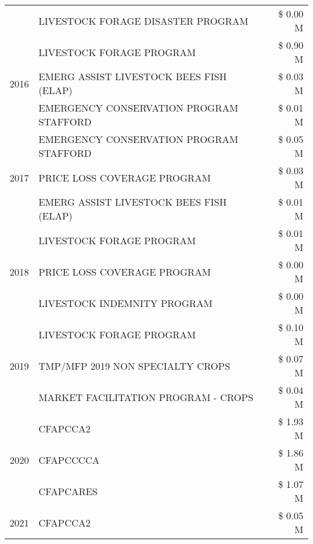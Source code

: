 \begin{tabular}{llr}
 & LIVESTOCK FORAGE DISASTER PROGRAM & \$ 0.00 M \\
\cline{1-3}
\multirow[t]{3}{*}{2016} & LIVESTOCK FORAGE PROGRAM & \$ 0.90 M \\
 & EMERG ASSIST LIVESTOCK BEES FISH (ELAP) & \$ 0.03 M \\
 & EMERGENCY CONSERVATION PROGRAM STAFFORD & \$ 0.01 M \\
\cline{1-3}
\multirow[t]{3}{*}{2017} & EMERGENCY CONSERVATION PROGRAM STAFFORD & \$ 0.05 M \\
 & PRICE LOSS COVERAGE PROGRAM & \$ 0.03 M \\
 & EMERG ASSIST LIVESTOCK BEES FISH (ELAP) & \$ 0.01 M \\
\cline{1-3}
\multirow[t]{3}{*}{2018} & LIVESTOCK FORAGE PROGRAM & \$ 0.01 M \\
 & PRICE LOSS COVERAGE PROGRAM & \$ 0.00 M \\
 & LIVESTOCK INDEMNITY PROGRAM & \$ 0.00 M \\
\cline{1-3}
\multirow[t]{3}{*}{2019} & LIVESTOCK FORAGE PROGRAM & \$ 0.10 M \\
 & TMP/MFP 2019 NON SPECIALTY CROPS & \$ 0.07 M \\
 & MARKET FACILITATION PROGRAM - CROPS & \$ 0.04 M \\
\cline{1-3}
\multirow[t]{3}{*}{2020} & CFAPCCA2 & \$ 1.93 M \\
 & CFAPCCCCA & \$ 1.86 M \\
 & CFAPCARES & \$ 1.07 M \\
\cline{1-3}
2021 & CFAPCCA2 & \$ 0.05 M \\
\cline{1-3}
\bottomrule
\end{tabular}
